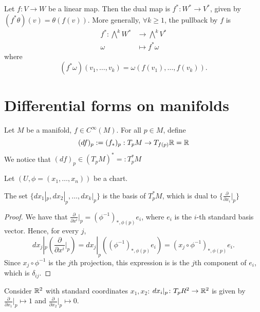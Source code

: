 \begin{definition}[Pullback]
    Let $f : V \to  W$ be a linear map.
    Then the dual map is $f^{*}: W^{*} \to  V^{*}$, given by $(f^{*}\theta)(v) = \theta(f(v))$.
    More generally, $\forall k \ge 1$, the pullback by $f$ is 
    \begin{align*}
        f^{*}:  \bigwedge^{k} W^{*}&\longrightarrow  \bigwedge^{k} V^{*}\\
        \omega&\longmapsto f^{*} \omega   \end{align*}
 where
 $$(f^{*} \omega)(v_1, \ldots, v_k) = \omega(f(v_1), \ldots, f(v_k)).$$
       
      
\end{definition}


\section{Differential forms on manifolds}\label{sec:diffformman}

Let $M$ be a manifold, $f \in C^{\infty}(M)$.
For all $p \in M$, define \[
    (df)_p := (f_*)_p: T_pM \to  T_{f(p)} \mathbb{R} = \mathbb{R}
\]
We notice that $(df)_p \in (T_pM)^{*} =: T^{*}_p M$
 
Let $(U, \phi = (x_1, \ldots, x_n))$ be a chart.

\begin{lemma}
    The set $\{dx_1|_p, dx_2|_p, \ldots, dx_{k}|_p\}$ is the basis of $T^{*}_p M $, which is dual to $\big\{\frac{\partial }{\partial x_i}\big|_p \big\} $
\end{lemma}
\begin{proof}
    We have that $\frac{\partial }{\partial x^i}\big|_p = (\phi^{-1})_{*, \phi(p)} e_i$, where $e_i$ is the $i$-th standard basis vector.
    Hence, for every $j$, \[
    dx_{j}|_p\left(\frac{\partial }{\partial x^i}\Big|_p\right) = 
    dx_{j}|_p\left((\phi^{-1})_{*, \phi(p)} e_i\right) = 
    (x_{j}  \circ  \phi^{-1})_{*, \phi(p)} e_i
.\]
Since $x_{j}  \circ  \phi^{-1}$ is the $j$th projection, this expression is
 is the $j$th component of $e_i$, which is $\delta_{ij}$.
\end{proof}

\begin{eg}
Consider $\mathbb{R}^2$ with standard coordinates $x_1, x_2$: $dx_i|_p\colon T_pR^2\to \mathbb{R}^2$ is given by $\frac{\partial }{\partial x_1}|_p\mapsto 1$ and $\frac{\partial }{\partial x_2}|_p\mapsto 0$.
\end{eg}
